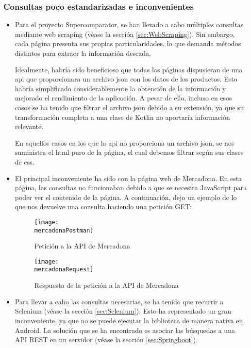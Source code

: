 \documentclass[12pt,twoside,titlepage]{report}
\newcommand{\titulotrabajo}{Supercomparator}
\newcommand{\mercadonaPostman}{images/mercadona_postman.png}
\newcommand{\mercadonaRequest}{images/mercadona_request.png}
\begin{document}
\subsubsection{Consultas poco estandarizadas e inconvenientes}

\label{sec:Mal-Consultas}

\begin{itemize}

\item Para el proyecto \titulotrabajo, se han llevado a cabo múltiples consultas mediante web scraping (véase la sección \ref{sec:WebScraping}). Sin embargo, cada página presenta sus propias particularidades, lo que demanda métodos distintos para extraer la información deseada.

Idealmente, habría sido beneficioso que todas las páginas dispusieran de una api que proporcionara un archivo json con los datos de los productos. Esto habría simplificado considerablemente la obtención de la información y mejorado el rendimiento de la aplicación. A pesar de ello, incluso en esos casos se ha tenido que filtrar el archivo json debido a su extensión, ya que su transformación completa a una clase de Kotlin no aportaría información relevante.

En aquellos casos en los que la api no proporciona un archivo json, se nos suministra el html puro de la página, el cual debemos filtrar según sus clases de css.

\item El principal inconveniente ha sido con la página web de Mercadona. En esta página, las consultas no funcionaban debido a que se necesita JavaScript para poder ver el contenido de la página. A continuación, dejo un ejemplo de lo que nos devuelve una consulta haciendo una petición GET:


    \begin{figure}[H]
				\centering
				\texttt{[image: \\mercadonaPostman]}
				\caption{Petición a la API de Mercadona}
				\label{fig:mercadonaPostman}
			\end{figure}

			\begin{figure}[H]
				\centering
				\texttt{[image: \\mercadonaRequest]}
				\caption{Respuesta de la petición a la API de Mercadona}
				\label{fig:mercadonaRequest}
			\end{figure}

\item Para llevar a cabo las consultas necesarias, se ha tenido que recurrir a Selenium (véase la sección \ref{sec:Selenium}). Esto ha representado un gran inconveniente, ya que no se puede ejecutar la biblioteca de manera nativa en Android. La solución que se ha encontrado es asociar las búsquedas a una API REST en un servidor (véase la sección \ref{sec:Springboot}).

\end{itemize}
\end{document}
